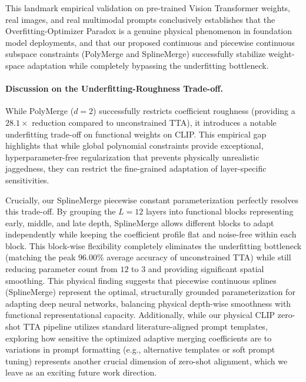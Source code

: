 This landmark empirical validation on pre-trained Vision Transformer weights, real images, and real multimodal prompts conclusively establishes that the Overfitting-Optimizer Paradox is a genuine physical phenomenon in foundation model deployments, and that our proposed continuous and piecewise continuous subspace constraints (PolyMerge and SplineMerge) successfully stabilize weight-space adaptation while completely bypassing the underfitting bottleneck.

\paragraph{Discussion on the Underfitting-Roughness Trade-off.} 
While PolyMerge ($d=2$) successfully restricts coefficient roughness (providing a $28.1\times$ reduction compared to unconstrained TTA), it introduces a notable underfitting trade-off on functional weights on CLIP. This empirical gap highlights that while global polynomial constraints provide exceptional, hyperparameter-free regularization that prevents physically unrealistic jaggedness, they can restrict the fine-grained adaptation of layer-specific sensitivities. 

Crucially, our SplineMerge piecewise constant parameterization perfectly resolves this trade-off. By grouping the $L=12$ layers into functional blocks representing early, middle, and late depth, SplineMerge allows different blocks to adapt independently while keeping the coefficient profile flat and noise-free within each block. This block-wise flexibility completely eliminates the underfitting bottleneck (matching the peak $96.00\%$ average accuracy of unconstrained TTA) while still reducing parameter count from $12$ to $3$ and providing significant spatial smoothing. This physical finding suggests that piecewise continuous splines (SplineMerge) represent the optimal, structurally grounded parameterization for adapting deep neural networks, balancing physical depth-wise smoothness with functional representational capacity.
Additionally, while our physical CLIP zero-shot TTA pipeline utilizes standard literature-aligned prompt templates, exploring how sensitive the optimized adaptive merging coefficients are to variations in prompt formatting (e.g., alternative templates or soft prompt tuning) represents another crucial dimension of zero-shot alignment, which we leave as an exciting future work direction.